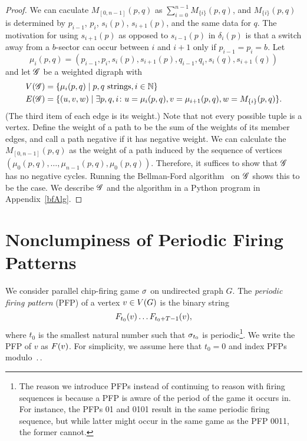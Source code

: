 \begin{proof}
We can caculate $M_{[0,n-1]}(p,q)$ as $\sum_{i=0}^{n-1}M_{\{i\}}(p,q)$, and
$M_{\{i\}}(p,q)$ is determined by $p_{i-1}$, $p_i$, $s_i(p)$, $s_{i+1}(p)$, and
the same data for $q$. The motivation for using $s_{i+1}(p)$ as opposed to
$s_{i-1}(p)$ in $\delta_i(p)$ is that a switch away from a $b$-sector can occur
between $i$ and $i+1$ only if $p_{i-1} = p_i = b$. Let
\[
  \mu_i(p,q) = (p_{i-1},p_i,s_i(p),s_{i+1}(p),q_{i-1},q_i,s_i(q),s_{i+1}(q))
\]
and let $\mathscr{G}$ be a weighted digraph with
\begin{align*}
  \V[\G] &= \set{\mu_i(p,q)}{p,q \text{ strings}, i \in \nats} \\
  \E[\G] &= \set{(u,v,w)}{\exists p,q,i\colon
    u = \mu_i(p,q),
    v = \mu_{i+1}(p,q),
    w = M_{\{i\}}(p,q)}.
\end{align*}
(The third item of each edge is its weight.) Note that not every possible tuple
is a vertex. Define the weight of a path to be the sum of the weights of its
member edges, and call a path negative if it has negative weight. We can
calculate the $M_{[0,n-1]}(p,q)$ as the weight of a path induced by the
sequence of vertices $(\mu_0(p,q), \dots, \mu_{n-1}(p,q),
\mu_0(p,q))$. Therefore, it suffices to show that $\mathscr{G}$ has no negative
cycles. Running the Bellman-Ford algorithm~\cite{bellmanford} on $\mathscr{G}$ shows
this to be the case. We describe $\mathscr{G}$ and the algorithm in a Python program in
Appendix~\ref{bfAlg}.
\qquad\end{proof}

\section{Nonclumpiness of Periodic Firing Patterns}\label{nonclumpiness}
We consider parallel chip-firing game $\sigma$ on undirected graph $G$. The
\emph{periodic firing pattern} (PFP) of a vertex $v \in V(G)$ is the binary
string
\[
  \firing{v}{t_0}\dots\firing{v}{t_0 + \period - 1},
\]
where $t_0$ is the smallest natural number such that $\sigma_{t_0}$ is
periodic\footnote{The reason we introduce PFPs instead of continuing to reason
  with firing sequences is because a PFP is aware of the period of the game it
  occurs in. For instance, the PFPs 01 and 0101 result in the same periodic
  firing sequence, but while latter might occur in the same game as the PFP
  0011, the former cannot.}. We write the PFP of $v$ as $\pfp{v}$. For
simplicity, we assume here that $t_0 = 0$ and index PFPs modulo $\period$.

